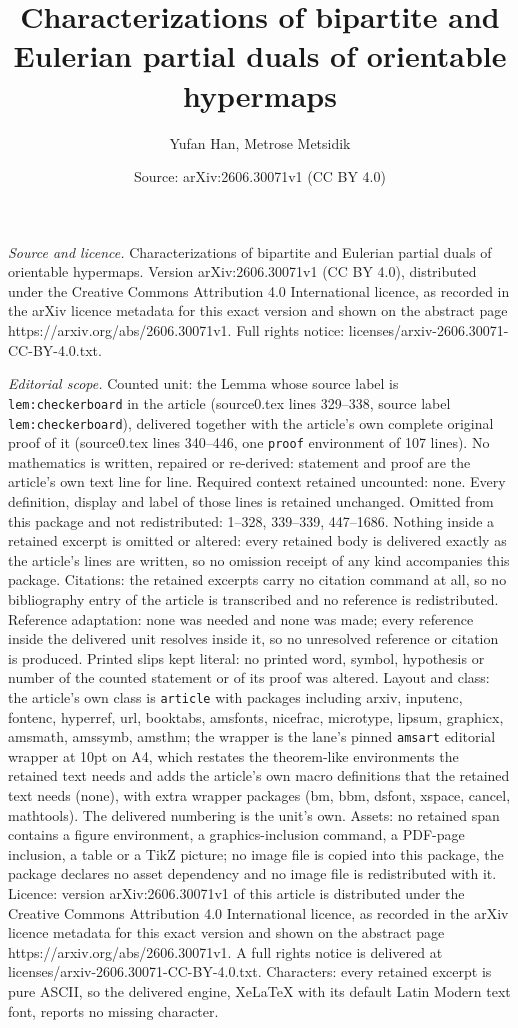 \documentclass[10pt,a4paper]{amsart}
\title[Characterizations of bipartite and Eulerian partial duals of]{Characterizations of bipartite and Eulerian partial duals of orientable hypermaps}
\author{Yufan Han, Metrose Metsidik}
\date{Source: arXiv:2606.30071v1 (CC BY 4.0)}
\begin{document}
\maketitle

\noindent\emph{Source and licence.} Characterizations of bipartite and Eulerian partial duals of orientable hypermaps. Version arXiv:2606.30071v1 (CC BY 4.0), distributed under the Creative Commons Attribution 4.0 International licence, as recorded in the arXiv licence metadata for this exact version and shown on the abstract page https://arxiv.org/abs/2606.30071v1. Full rights notice: licenses/arxiv-2606.30071-CC-BY-4.0.txt.\par\smallskip

\noindent\textit{Editorial scope.} Counted unit: the Lemma whose source label is \texttt{lem:checkerboard} in the article (source0.tex lines 329--338, source label \texttt{lem:checkerboard}), delivered together with the article's own complete original proof of it (source0.tex lines 340--446, one \texttt{proof} environment of 107 lines). No mathematics is written, repaired or re-derived: statement and proof are the article's own text line for line. Required context retained uncounted: none. Every definition, display and label of those lines is retained unchanged. Omitted from this package and not redistributed: 1--328, 339--339, 447--1686. Nothing inside a retained excerpt is omitted or altered: every retained body is delivered exactly as the article's lines are written, so no omission receipt of any kind accompanies this package. Citations: the retained excerpts carry no citation command at all, so no bibliography entry of the article is transcribed and no reference is redistributed. Reference adaptation: none was needed and none was made; every reference inside the delivered unit resolves inside it, so no unresolved reference or citation is produced. Printed slips kept literal: no printed word, symbol, hypothesis or number of the counted statement or of its proof was altered. Layout and class: the article's own class is \texttt{article} with packages including arxiv, inputenc, fontenc, hyperref, url, booktabs, amsfonts, nicefrac, microtype, lipsum, graphicx, amsmath, amssymb, amsthm; the wrapper is the lane's pinned \texttt{amsart} editorial wrapper at 10pt on A4, which restates the theorem-like environments the retained text needs and adds the article's own macro definitions that the retained text needs (none), with extra wrapper packages (bm, bbm, dsfont, xspace, cancel, mathtools). The delivered numbering is the unit's own. Assets: no retained span contains a figure environment, a graphics-inclusion command, a PDF-page inclusion, a table or a TikZ picture; no image file is copied into this package, the package declares no asset dependency and no image file is redistributed with it. Licence: version arXiv:2606.30071v1 of this article is distributed under the Creative Commons Attribution 4.0 International licence, as recorded in the arXiv licence metadata for this exact version and shown on the abstract page https://arxiv.org/abs/2606.30071v1. A full rights notice is delivered at licenses/arxiv-2606.30071-CC-BY-4.0.txt. Characters: every retained excerpt is pure ASCII, so the delivered engine, XeLaTeX with its default Latin Modern text font, reports no missing character.
\end{document}
